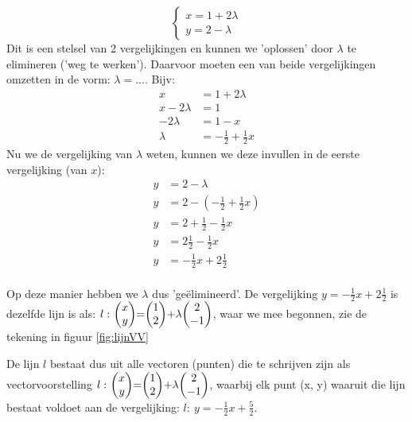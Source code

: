 \[\begin{cases}
x = 1 + 2\lambda\\
y = 2 - \lambda 
\end{cases}
\] 
Dit is een stelsel van 2 vergelijkingen  en kunnen we 'oplossen' door $ \lambda $ te elimineren ('weg te werken'). Daarvoor moeten een van beide vergelijkingen omzetten in de vorm: $\lambda = ...$. Bijv:
\begin{align*}
  x & = 1 + 2\lambda \\
  x - 2\lambda &= 1 \\
  -2\lambda &= 1 - x \\
  \lambda &= -\frac{1}{2} + \frac{1}{2}x
\end{align*}
Nu we de vergelijking van $\lambda$ weten, kunnen we deze invullen in de eerste vergelijking (van $x$):
\begin{align*}
  y &= 2 - \lambda \\
  y &= 2 - (-\frac{1}{2} + \frac{1}{2}x) \\
  y &= 2 + \frac{1}{2} - \frac{1}{2}x \\
  y &= 2\frac{1}{2} - \frac{1}{2}x \\
  y &= -\frac{1}{2}x + 2\frac{1}{2} \\
\end{align*}

\newpage 
Op deze manier hebben we $\lambda$ dus 'geëlimineerd'. De vergelijking  $ y = -\frac{1}{2}x + 2\frac{1}{2} $  is dezelfde lijn is als: $ l: \ \vectwee {x}{y} = \vectwee {1}{2} + \lambda  \vectwee {2}{-1}  $, waar we mee begonnen, zie de tekening in  figuur  \ref{fig:lijnVV} \\


De lijn $l$ bestaat dus uit alle vectoren (punten) die te schrijven zijn als vectorvoorstelling $ l: \ \vectwee {x}{y} = \vectwee {1}{2} + \lambda  \vectwee {2}{-1}  $, waarbij elk punt (x, y) waaruit die lijn bestaat voldoet aan de vergelijking: $ l:  \ y = - \frac{1}{2}x + \frac{5}{2} $.

